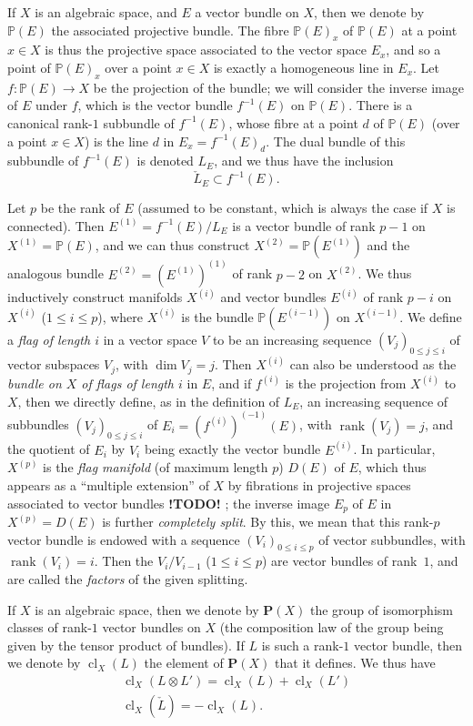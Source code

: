 \documentclass{article}
\theoremstyle{plain}
\theoremstyle{definition}
\newcommand{\PP}{\mathbf{P}}
\renewcommand{\leq}{\leqslant}
\DeclareMathOperator{\rank}{rank}
\DeclareMathOperator{\cl}{cl}
\newcommand{\todo}{\textbf{ !TODO! }}
\newcommand{\oldpage}[1]{\marginpar{\footnotesize$\Big\vert$ \textit{p.~#1}}}
\begin{document}
If $X$ is an algebraic space, and $E$ a vector bundle on $X$, then we denote by $\mathbb{P}(E)$ the associated projective bundle.
The fibre $\mathbb{P}(E)_x$ of $\mathbb{P}(E)$ at a point $x\in X$ is thus the projective space associated to the vector space $E_x$, and so a point of $\mathbb{P}(E)_x$ over a point $x\in X$ is exactly a homogeneous line in $E_x$.
Let $f\colon\mathbb{P}(E)\to X$ be the projection of the bundle;
we will consider the inverse image of $E$ under $f$, which is the vector bundle $f^{-1}(E)$ on $\mathbb{P}(E)$.
There is a canonical rank-$1$ subbundle of $f^{-1}(E)$, whose fibre at a point $d$ of $\mathbb{P}(E)$ (over a point $x\in X$) is the line $d$ in $E_x=f^{-1}(E)_d$.
The dual bundle of this subbundle of $f^{-1}(E)$ is denoted $L_E$, and we thus have the inclusion
\[
  \check{L}_E \subset f^{-1}(E).
\]

Let $p$ be the rank of $E$ (assumed to be constant, which is always the case if $X$ is connected).
Then $E^{(1)}=f^{-1}(E)/L_E$ is a vector bundle of rank $p-1$ on $X^{(1)}=\mathbb{P}(E)$, and we can thus construct $X^{(2)}=\mathbb{P}(E^{(1)})$ and the analogous bundle $E^{(2)}=(E^{(1)})^{(1)}$ of rank $p-2$ on $X^{(2)}$.
We thus inductively construct manifolds $X^{(i)}$ and vector bundles $E^{(i)}$ of rank $p-i$ on $X^{(i)}$ ($1\leq i\leq p$), where $X^{(i)}$ is the bundle $\mathbb{P}(E^{(i-1)})$ on $X^{(i-1)}$.
We define a \emph{flag of length $i$} in a vector space $V$ to be an increasing sequence $(V_j)_{0\leq j\leq i}$ of vector subspaces $V_j$, with $\dim V_j=j$.
Then $X^{(i)}$ can also be understood as the \emph{bundle on $X$ of flags of length $i$} in $E$, and if $f^{(i)}$ is the projection from $X^{(i)}$ to $X$, then we directly define, as in the definition of $L_E$, an increasing sequence of subbundles $(V_j)_{0\leq j\leq i}$ of $E_i=(f^{(i)})^{(-1)}(E)$, with $\rank(V_j)=j$, and the quotient of $E_i$ by $V_i$ being exactly the vector bundle $E^{(i)}$.
In particular, $X^{(p)}$ is the \emph{flag manifold} (of maximum length $p$) $D(E)$ of $E$, which thus appears as a ``multiple extension'' of $X$ by fibrations in projective spaces associated to vector bundles\todo;
the inverse image $E_p$ of $E$ in $X^{(p)}=D(E)$ is further \emph{completely split}.
By this, we mean that this rank-$p$ vector bundle is endowed with a sequence $(V_i)_{0\leq i\leq p}$ of vector subbundles,
\oldpage{139}
with $\rank(V_i)=i$.
Then the $V_i/V_{i-1}$ ($1\leq i\leq p$) are vector bundles of rank~$1$, and are called the \emph{factors} of the given splitting.

If $X$ is an algebraic space, then we denote by $\PP(X)$ the group of isomorphism classes of rank-$1$ vector bundles on $X$ (the composition law of the group being given by the tensor product of bundles).
If $L$ is such a rank-$1$ vector bundle, then we denote by $\cl_X(L)$ the element of $\PP(X)$ that it defines.
We thus have
\begin{gather*}
  \cl_X(L\otimes L') = \cl_X(L) + \cl_X(L')
\\\cl_X(\check{L}) = -\cl_X(L).
\end{gather*}
\end{document}
